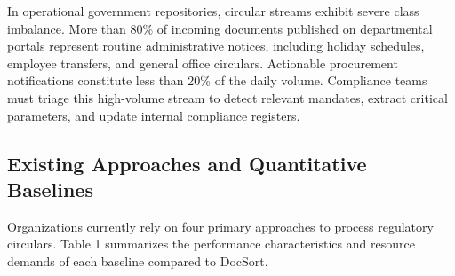 \documentclass{article}
\begin{document}
In operational government repositories, circular streams exhibit severe class imbalance. More than 80\% of incoming documents published on departmental portals represent routine administrative notices, including holiday schedules, employee transfers, and general office circulars. Actionable procurement notifications constitute less than 20\% of the daily volume. Compliance teams must triage this high-volume stream to detect relevant mandates, extract critical parameters, and update internal compliance registers.

\subsection{Existing Approaches and Quantitative Baselines}
Organizations currently rely on four primary approaches to process regulatory circulars. Table 1 summarizes the performance characteristics and resource demands of each baseline compared to DocSort.

\begin{table}[t]
\centering
{}
\caption{Quantitative comparison of existing baselines versus the proposed DocSort pipeline.}
\label{tab:baselines}
\end{table}
\end{document}
